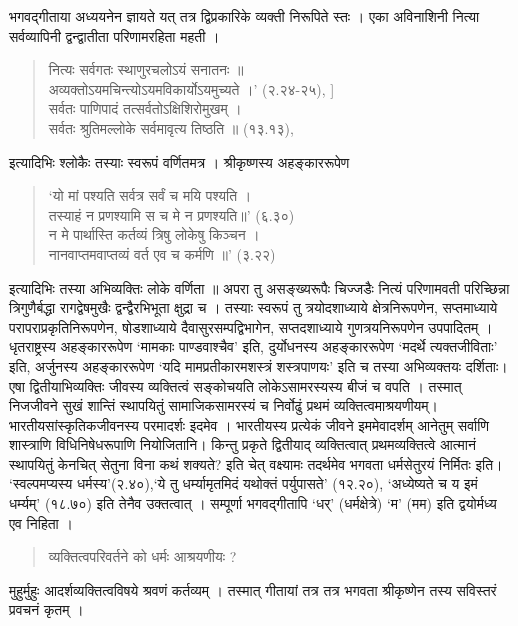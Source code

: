 {भगवद्गीताया अध्ययनेन ज्ञायते यत् तत्र द्विप्रकारिके व्यक्ती निरूपिते स्तः । एका अविनाशिनी नित्या सर्वव्यापिनी द्वन्द्वातीता परिणामरहिता महती । 
\begin{verse}
नित्यः सर्वगतः स्थाणुरचलोऽयं सनातनः ॥ \\
अव्यक्तोऽयमचिन्त्योऽयमविकार्योऽयमुच्यते ।' (२.२४-२५), ]\\
सर्वतः पाणिपादं तत्सर्वतोऽक्षिशिरोमुखम् ।\\
सर्वतः श्रुतिमल्लोके सर्वमावृत्य तिष्ठति ॥ (१३.१३), 
\end{verse}
इत्यादिभिः श्लोकैः तस्याः स्वरूपं वर्णितमत्र । श्रीकृष्णस्य अहङ्काररूपेण 
\begin{verse}
‘यो मां पश्यति सर्वत्र सर्वं च मयि पश्यति । \\
तस्याहं न प्रणश्यामि स च मे न प्रणश्यति॥' (६.३०)\\
न मे पार्थास्ति कर्तव्यं त्रिषु लोकेषु किञ्चन । \\
नानवाप्तमवाप्तव्यं वर्त एव च कर्मणि ॥' (३.२२) 
\end{verse}
इत्यादिभिः तस्या अभिव्यक्तिः लोके वर्णिता ॥ अपरा तु असङ्ख्यरूपैः चिज्जडैः नित्यं परिणामवती परिच्छिन्ना त्रिगुणैर्बद्धा रागद्वेषमुखैः द्वन्द्वैरभिभूता क्षुद्रा च । तस्याः स्वरूपं तु त्रयोदशाध्याये क्षेत्रनिरूपणेन, सप्तमाध्याये परापराप्रकृतिनिरूपणेन, षोडशाध्याये दैवासुरसम्पद्विभागेन, सप्तदशाध्याये गुणत्रयनिरूपणेन उपपादितम् । धृतराष्ट्रस्य अहङ्काररूपेण ‘मामकाः पाण्डवाश्चैव' इति, दुर्योधनस्य अहङ्काररूपेण ‘मदर्थे त्यक्तजीविताः' इति, अर्जुनस्य अहङ्काररूपेण ‘यदि मामप्रतीकारमशस्त्रं शस्त्रपाणयः' इति च तस्या अभिव्यक्तयः दर्शिताः। एषा द्वितीयाभिव्यक्तिः जीवस्य व्यक्तित्वं सङ्कोचयति लोकेऽसामरस्यस्य बीजं च वपति । तस्मात् निजजीवने सुखं शान्तिं स्थापयितुं सामाजिकसामरस्यं च निर्वोढुं प्रथमं व्यक्तित्वमाश्रयणीयम्। भारतीयसांस्कृतिकजीवनस्य परमादर्शः इदमेव । भारतीयस्य प्रत्येकं जीवने इममेवादर्शम् आनेतुम् सर्वाणि शास्त्राणि विधिनिषेधरूपाणि नियोजितानि। किन्तु प्रकृते द्वितीयाद् व्यक्तित्वात् प्रथमव्यक्तित्वे आत्मानं स्थापयितुं केनचित् सेतुना विना कथं शक्यते? इति चेत् वक्ष्यामः तदर्थमेव भगवता धर्मसेतुरयं निर्मितः इति। ‘स्वल्पमप्यस्य धर्मस्य'(२.४०),‘ये तु धर्म्यामृतमिदं यथोक्तं पर्युपासते' (१२.२०), ‘अध्येष्यते च य इमं धर्म्यम्' (१८.७०) इति तेनैव उक्तत्वात् । सम्पूर्णा भगवद्गीतापि ‘धर्' (धर्मक्षेत्रे) ‘म' (मम) इति द्वयोर्मध्य एव निहिता ।
\begin{verse}
व्यक्तित्वपरिवर्तने को धर्मः आश्रयणीयः ?
\end{verse}
मुहुर्मुहुः आदर्शव्यक्तित्वविषये श्रवणं कर्तव्यम् । तस्मात् गीतायां तत्र तत्र भगवता श्रीकृष्णेन तस्य सविस्तरं प्रवचनं कृतम् । 
\begin{verse}

\end{verse}}
